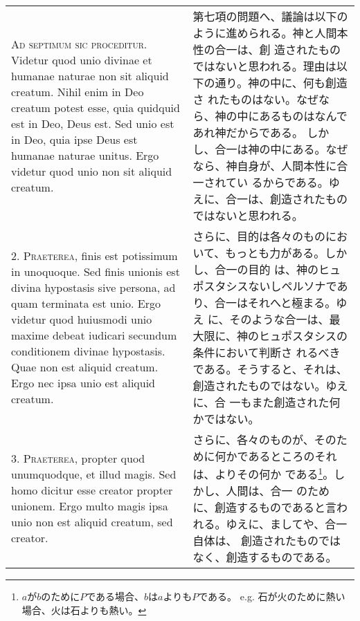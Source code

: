 \documentclass[10pt]{jsarticle} %
\begin{document}
\begin{longtable}{p{21em}p{21em}}

{\Huge A}{\scshape d septimum sic proceditur}. Videtur quod unio
divinae et humanae naturae non sit aliquid creatum. Nihil enim in Deo
creatum potest esse, quia quidquid est in Deo, Deus est. Sed unio est
in Deo, quia ipse Deus est humanae naturae unitus. Ergo videtur quod
unio non sit aliquid creatum.


&

第七項の問題へ、議論は以下のように進められる。神と人間本性の合一は、創
造されたものではないと思われる。理由は以下の通り。神の中に、何も創造さ
れたものはない。なぜなら、神の中にあるものはなんであれ神だからである。
しかし、合一は神の中にある。なぜなら、神自身が、人間本性に合一されてい
るからである。ゆえに、合一は、創造されたものではないと思われる。


\\



2. {\scshape Praeterea}, finis est potissimum in unoquoque. Sed finis
unionis est divina hypostasis sive persona, ad quam terminata est
unio. Ergo videtur quod huiusmodi unio maxime debeat iudicari secundum
conditionem divinae hypostasis. Quae non est aliquid creatum. Ergo nec
ipsa unio est aliquid creatum.


&

さらに、目的は各々のものにおいて、もっとも力がある。しかし、合一の目的
は、神のヒュポスタシスないしペルソナであり、合一はそれへと極まる。ゆえ
に、そのような合一は、最大限に、神のヒュポスタシスの条件において判断さ
れるべきである。そうすると、それは、創造されたものではない。ゆえに、合
一もまた創造された何かではない。

\\



3. {\scshape Praeterea}, propter quod unumquodque, et illud magis. Sed
homo dicitur esse creator propter unionem. Ergo multo magis ipsa unio
non est aliquid creatum, sed creator.


&

さらに、各々のものが、そのために何かであるところのそれは、よりその何か
である\footnote{$a$が$b$のために$P$である場合、$b$は$a$よりも$P$である。
e.g. 石が火のために熱い場合、火は石よりも熱い。}。しかし、人間は、合一
のために、創造するものであると言われる。ゆえに、ましてや、合一自体は、
創造されたものではなく、創造するものである。

\\




\end{longtable}
\end{document}
